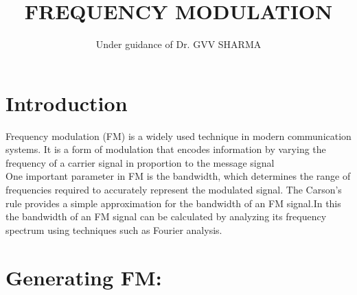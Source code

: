 \documentclass[journal,5pt,twocolumn]{IEEEtran}
\renewcommand\thesection{\arabic{section}}
\begin{document}
\let\StandardTheFigure\thefigure
\let\StandardTheFigure\thefigure
\let\StandardTheTable\thetable
\let\vec\mathbf
\def\putbox#1#2#3{\makebox[0in][l]{\makebox[#1][l]{}\raisebox{\baselineskip}[0in][0in]{\raisebox{#2}[0in][0in]{#3}}}}
     \def\rightbox#1{\makebox[0in][r]{#1}}
     \def\centbox#1{\makebox[0in]{#1}}
     \def\topbox#1{\raisebox{-\baselineskip}[0in][0in]{#1}}
     \def\midbox#1{\raisebox{-0.5\baselineskip}[0in][0in]{#1}}
\title{ 
FREQUENCY MODULATION
}
\author{ Under guidance of Dr. GVV SHARMA}%
\maketitle
\tableofcontents
\section{\textbf{Introduction}}
Frequency modulation (FM) is a widely used technique in modern communication systems. It is a form of modulation that encodes information by varying the frequency of a carrier signal in proportion to the message signal\\
One important parameter in FM is the bandwidth, which determines the range of frequencies required to accurately represent the modulated signal. The Carson's rule provides a simple approximation for the bandwidth of an FM signal.In this the bandwidth of an FM signal can be calculated by analyzing its frequency spectrum using techniques such as Fourier analysis.
\section{\textbf{Generating FM:}}
\end{document}
